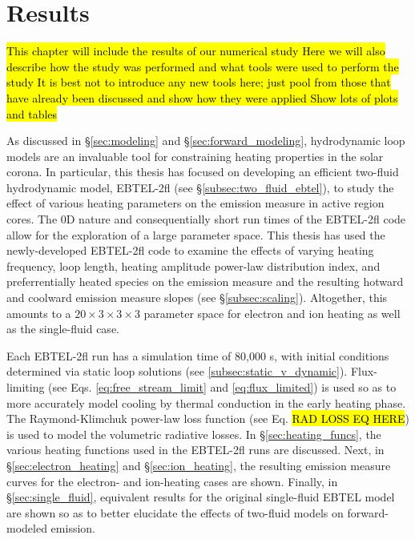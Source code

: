 \chapter{Results}
\label{ch:results}
\hl{This chapter will include the results of our numerical study
Here we will also describe how the study was performed and what tools were used to perform the study
It is best not to introduce any new tools here; just pool from those that have already been discussed and show how they were applied
Show lots of plots and tables}
%
\par As discussed in \S\ref{sec:modeling} and \S\ref{sec:forward_modeling}, hydrodynamic loop models are an invaluable tool for constraining heating properties in the solar corona. In particular, this thesis has focused on developing an efficient two-fluid hydrodynamic model, EBTEL-2fl (see \S\ref{subsec:two_fluid_ebtel}), to study the effect of various heating parameters on the emission measure in active region cores. The 0D nature and consequentially short run times of the EBTEL-2fl code allow for the exploration of a large parameter space. This thesis has used the newly-developed EBTEL-2fl code to examine the effects of varying heating frequency, loop length, heating amplitude power-law distribution index, and preferrentially heated species on the emission measure and the resulting hotward and coolward emission measure slopes (see \S\ref{subsec:scaling}). Altogether, this amounts to a $20\times3\times3\times3$ parameter space for electron and ion heating as well as the single-fluid case. 
%
\par Each EBTEL-2fl run has a simulation time of 80,000 s, with initial conditions determined via static loop solutions (see \ref{subsec:static_v_dynamic}). Flux-limiting (see Eqs. \ref{eq:free_stream_limit} and \ref{eq:flux_limited}) is used so as to more accurately model cooling by thermal conduction in the early heating phase. The Raymond-Klimchuk power-law loss function (see Eq. \hl{RAD LOSS EQ HERE}) is used to model the volumetric radiative losses. In \S\ref{sec:heating_funcs}, the various heating functions used in the EBTEL-2fl runs are discussed. Next, in \S\ref{sec:electron_heating} and \S\ref{sec:ion_heating}, the resulting emission measure curves for the electron- and ion-heating cases are shown. Finally, in \S\ref{sec:single_fluid}, equivalent results for the original single-fluid EBTEL model are shown so as to better elucidate the effects of two-fluid models on forward-modeled emission.
%

